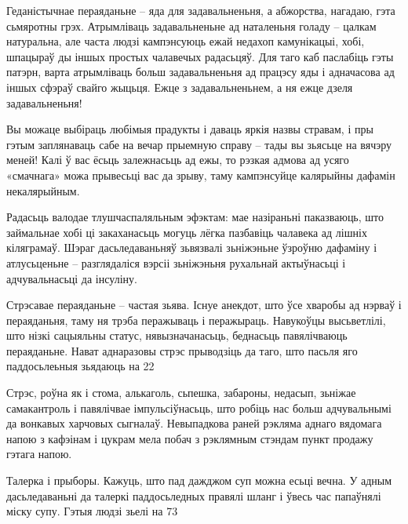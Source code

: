 Геданістычнае пераяданьне – яда для задавальненьня, а абжорства, нагадаю, гэта сьмяротны грэх. Атрымліваць задавальненьне ад наталеньня голаду – цалкам натуральна, але часта людзі кампэнсуюць ежай недахоп камунікацыі, хобі, шпацыраў ды іншых простых чалавечых радасьцяў. Для таго каб паслабіць гэты патэрн, варта атрымліваць больш задавальненьня ад працэсу яды і адначасова ад іншых сфэраў свайго жыцьця. Ежце з задавальненьнем, а ня ежце дзеля задавальненьня!

Вы можаце выбіраць любімыя прадукты і даваць яркія назвы стравам, і пры гэтым заплянаваць сабе на вечар прыемную справу – тады вы зьясьце на вячэру меней! Калі ў вас ёсьць залежнасьць ад ежы, то рэзкая адмова ад усяго «смачнага» можа прывесьці вас да зрыву, таму кампэнсуйце калярыйны дафамін некалярыйным.

Радасьць валодае тлушчаспаляльным эфэктам: мае назіраньні паказваюць, што займальнае хобі ці закаханасьць могуць лёгка пазбавіць чалавека ад лішніх кіляграмаў. Шэраг дасьледаваньняў зьвязвалі зьніжэньне ўзроўню дафаміну і атлусьценьне – разглядаліся вэрсіі зьніжэньня рухальнай актыўнасьці і адчувальнасьці да інсуліну.

Стрэсавае пераяданьне – частая зьява. Існуе анекдот, што ўсе хваробы ад нэрваў і пераяданьня, таму ня трэба перажываць і перажыраць. Навукоўцы высьветлілі, што нізкі сацыяльны статус, нявызначанасьць, беднасьць павялічваюць пераяданьне. Нават аднаразовы стрэс прыводзіць да таго, што пасьля яго паддосьлеьныя зьядаюць на 22%

Стрэс, роўна як і стома, алькаголь, сьпешка, забароны, недасып, зьніжае самакантроль і павялічвае імпульсіўнасьць, што робіць нас больш адчувальнымі да вонкавых харчовых сыгналаў. Невыпадкова раней рэкляма аднаго вядомага напою з кафэінам і цукрам мела побач з рэклямным стэндам пункт продажу гэтага напою.

Талерка і прыборы. Кажуць, што пад дажджом суп можна есьці вечна. У адным дасьледаваньні да талеркі паддосьледных правялі шланг і ўвесь час папаўнялі міску супу. Гэтыя людзі зьелі на 73%

